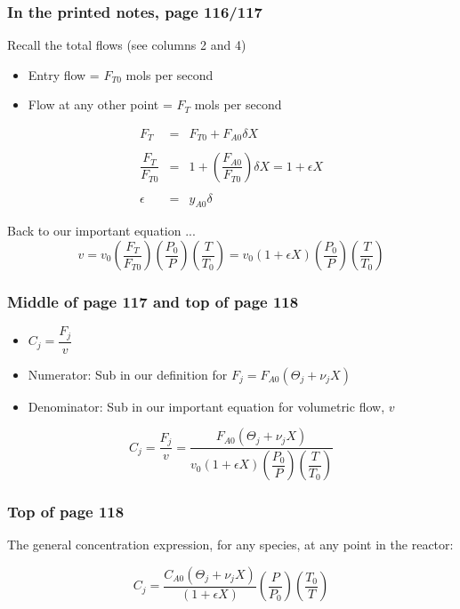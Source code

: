 \begin{frame}\frametitle{In the printed notes, page 116/117}
	Recall the total flows (see columns 2 and 4)
	\begin{itemize}
		\item	Entry flow = $F_{T0}$ mols per second
		\item	Flow at any other point = $F_T$ mols per second
	\end{itemize}
	$$\begin{array}{rcl}
		F_T &=& F_{T0}+ F_{A0}\delta X \\ \\
		\dfrac{F_T}{ F_{T0}} &=& 1 + \left(\dfrac{F_{A0}}{F_{T0}}\right)\delta X = 1 + \epsilon X \\ \\
		\epsilon &=& y_{A0} \delta
	\end{array} 
	$$
	\begin{exampleblock}{Back to our important equation ...}
		\small
		$$v = v_0 \left(\dfrac{F_T}{F_{T0}}\right)\left(\dfrac{P_0}{P}\right)\left(\dfrac{T}{T_{0}}\right) = v_0 \left(1 + \epsilon X\right)\left(\dfrac{P_0}{P}\right)\left(\dfrac{T}{T_{0}}\right) $$
	\end{exampleblock}	
\end{frame}

\begin{frame}\frametitle{Middle of page 117 and top of page 118}
	\begin{itemize}
		\item	$C_j = \dfrac{F_j}{v}$ {\footnotesize\hfill {\color{myOrange}{$\leftarrow$ applies anywhere along the reactor}}}
		\item	{\small {\footnotesize Numerator}: Sub in our definition for $F_j = F_{A0}\left(\Theta_j+\nu_j X\right) $}
		\item	{\small {\footnotesize Denominator}: Sub in our important equation for volumetric flow, $v$}
	\end{itemize}
	\vspace{12pt}
	$$C_j = \dfrac{F_j}{v} = \dfrac{F_{A0}\left(\Theta_j+\nu_j X\right)}{v_0 \left(1 + \epsilon X\right)\left(\dfrac{P_0}{P}\right)\left(\dfrac{T}{T_{0}}\right)}$$
\end{frame}

\begin{frame}\frametitle{Top of page 118}
	The general concentration expression, for any species, at any point in the reactor:
	\vspace{12pt}
	\begin{exampleblock}{}
		$$C_j =\dfrac{C_{A0}\left(\Theta_j+\nu_j X\right)}{\left(1 + \epsilon X\right)}\left(\dfrac{P}{P_0}\right)\left(\dfrac{T_0}{T}\right)$$
	\end{exampleblock}	
\end{frame}

